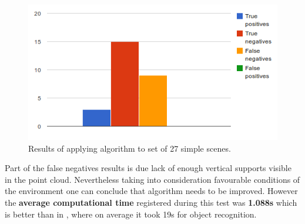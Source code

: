 \documentclass[fontsize=12pt]{article}
\begin{document}
\begin{figure}
  \includegraphics[scale=0.7]{images/resultChart}
  \caption{Results of applying algorithm to set of 27 simple scenes.}
  \label{fig:resultChart}
\end{figure}

Part of the false negatives results is due lack of enough vertical supports visible in the point cloud. Nevertheless taking into consideration favourable conditions of the environment one can conclude that algorithm needs to be improved. However the \textbf{average computational time} registered during this test was \textbf{1.088s} which is better than in \cite{pap1}, where on average it took 19s for object recognition.
\end{document}
